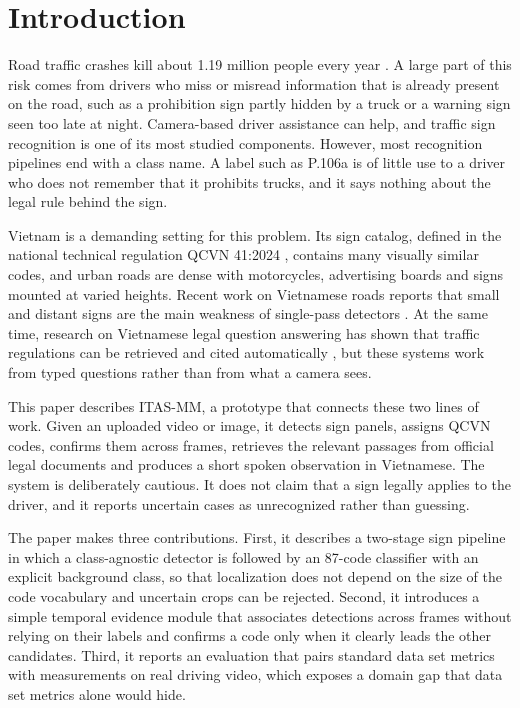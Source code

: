 \documentclass[conference,a4paper]{IEEEtran}
\begin{document}
\section{Introduction}

Road traffic crashes kill about 1.19 million people every year \cite{who2023}. A large part of this risk comes from drivers who miss or misread information that is already present on the road, such as a prohibition sign partly hidden by a truck or a warning sign seen too late at night. Camera-based driver assistance can help, and traffic sign recognition is one of its most studied components. However, most recognition pipelines end with a class name. A label such as P.106a is of little use to a driver who does not remember that it prohibits trucks, and it says nothing about the legal rule behind the sign.

Vietnam is a demanding setting for this problem. Its sign catalog, defined in the national technical regulation QCVN 41:2024 \cite{qcvn41}, contains many visually similar codes, and urban roads are dense with motorcycles, advertising boards and signs mounted at varied heights. Recent work on Vietnamese roads reports that small and distant signs are the main weakness of single-pass detectors \cite{nguyen2025}. At the same time, research on Vietnamese legal question answering has shown that traffic regulations can be retrieved and cited automatically \cite{lexisign,graphsign,vlsp2025}, but these systems work from typed questions rather than from what a camera sees.

This paper describes ITAS-MM, a prototype that connects these two lines of work. Given an uploaded video or image, it detects sign panels, assigns QCVN codes, confirms them across frames, retrieves the relevant passages from official legal documents and produces a short spoken observation in Vietnamese. The system is deliberately cautious. It does not claim that a sign legally applies to the driver, and it reports uncertain cases as unrecognized rather than guessing.

The paper makes three contributions. First, it describes a two-stage sign pipeline in which a class-agnostic detector is followed by an 87-code classifier with an explicit background class, so that localization does not depend on the size of the code vocabulary and uncertain crops can be rejected. Second, it introduces a simple temporal evidence module that associates detections across frames without relying on their labels and confirms a code only when it clearly leads the other candidates. Third, it reports an evaluation that pairs standard data set metrics with measurements on real driving video, which exposes a domain gap that data set metrics alone would hide.
\end{document}
